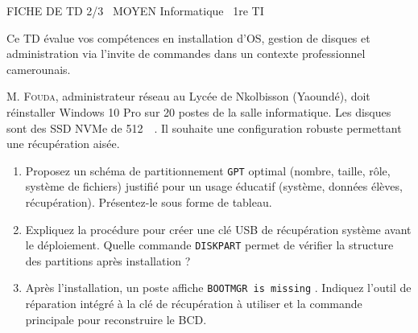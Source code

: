 \documentclass[11pt]{article}
\begin{document}
\begin{tcolorbox}[enhanced,colback=popink,colframe=popink,arc=10pt,boxrule=0pt,left=12pt,right=12pt,top=9pt,bottom=9pt]
{\color{white}\popxbold\small FICHE DE TD 2/3 \textbullet\ MOYEN \hfill Informatique \textbullet\ 1re TI\par}
\end{tcolorbox}
\vspace{4pt}
Ce TD évalue vos compétences en installation d'OS, gestion de disques et administration via l'invite de commandes dans un contexte professionnel camerounais.

\begin{exercice}
\label{exo:install_win}
M. \textsc{Fouda}, administrateur réseau au Lycée de Nkolbisson (Yaoundé), doit réinstaller Windows 10 Pro sur \num{20} postes de la salle informatique. Les disques sont des SSD NVMe de \SI{512}{\giga\byte}. Il souhaite une configuration robuste permettant une récupération aisée.
\begin{enumerate}
    \item [2 pts] Proposez un schéma de partitionnement \texttt{GPT} optimal (nombre, taille, rôle, système de fichiers) justifié pour un usage éducatif (système, données élèves, récupération). Présentez-le sous forme de tableau.
    \item [2 pts] Expliquez la procédure pour créer une \og clé USB de récupération système \fg{} avant le déploiement. Quelle commande \texttt{DISKPART} permet de vérifier la structure des partitions après installation ?
    \item [1 pt] Après l'installation, un poste affiche \og \texttt{BOOTMGR is missing} \fg{}. Indiquez l'outil de réparation intégré à la clé de récupération à utiliser et la commande principale pour reconstruire le BCD.
\end{enumerate}
\end{exercice}
\end{document}
